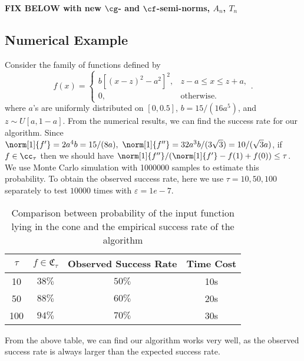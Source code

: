{\bf FIX BELOW with new $\cg$- and $\cf$-semi-norms, $A_n$, $T_n$}

\subsection{Numerical Example}
Consider the family of functions defined by
$$f(x)=
\begin{cases}
\displaystyle  b[(x-z)^2-a^2]^2, & z-a\leq x\leq z+a,\\[2ex]
\displaystyle  0, & \text{otherwise}.
\end{cases}.$$
where $a$'s are uniformly distributed on $[0,0.5]$, $b=15/(16a^5)$, and $z \sim U[a,1-a].$
From the numerical results, we can find the success rate for our algorithm. Since $\norm[1]{f'}=2a^4b=15/(8a), \ \norm[1]{f''}=32a^3b/(3\sqrt{3})=10/(\sqrt{3}a)$, if $f \in \cc_{\tau}$ then we should have
$\norm[1]{f''}/(\norm[1]{f'}-f(1)+f(0)) \leq \tau$. We use Monte Carlo simulation with 1000000 samples to estimate this probability. To obtain the observed success rate, here we use $\tau = 10, 50 , 100$ separately to test $10000$ times with $\varepsilon = 1e-7$.
\begin{table}[h]
\centering
\begin{tabular}{cccc}
$\tau$ & $f \in \mathfrak{C}_{\tau}$ & Observed Success Rate & Time Cost\\
\toprule
10 &  $38\%$ & $50\%$ & 10s \\
50 & $88\%$ & $60\%$ & 20s \\
100 & $94\%$ & $70\%$ & 30s\\
\end{tabular}
\caption{ Comparison between probability of the input function lying in the cone and the empirical success rate of the algorithm}
\end{table}

From the above table, we can find our algorithm works very well, as the observed
success rate is always larger than the expected success rate.

